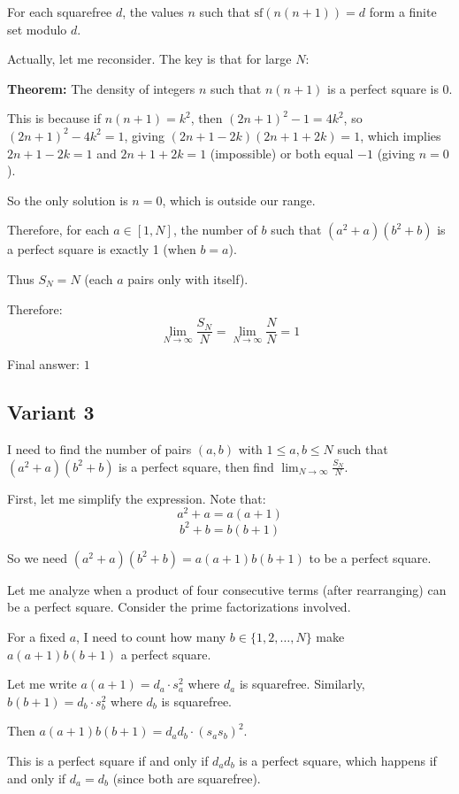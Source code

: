 \documentclass[12pt,a4paper]{article}
\theoremstyle{definition}
\begin{document}
    For each squarefree $d$, the values $n$ such that $\text{sf}(n(n+1)) = d$ form a finite set modulo $d$.

    Actually, let me reconsider. The key is that for large $N$:

    \textbf{Theorem:} The density of integers $n$ such that $n(n+1)$ is a perfect square is 0.

    This is because if $n(n+1) = k^2$, then $(2n+1)^2 - 1 = 4k^2$, so $(2n+1)^2 - 4k^2 = 1$, giving $(2n+1-2k)(2n+1+2k) = 1$, which implies $2n+1-2k = 1$ and $2n+1+2k = 1$ (impossible) or both equal $-1$ (giving $n = 0$).

    So the only solution is $n = 0$, which is outside our range.

    Therefore, for each $a \in [1,N]$, the number of $b$ such that $(a^2+a)(b^2+b)$ is a perfect square is exactly 1 (when $b = a$).

    Thus $S_N = N$ (each $a$ pairs only with itself).

    Therefore:
    $$\lim_{N \to \infty} \frac{S_N}{N} = \lim_{N \to \infty} \frac{N}{N} = 1$$

    Final answer: $1$
\subsection{Variant 3}
    I need to find the number of pairs $(a,b)$ with $1 \leq a,b \leq N$ such that $(a^2 + a)(b^2 + b)$ is a perfect square, then find $\lim_{N \to \infty} \frac{S_N}{N}$.

    First, let me simplify the expression. Note that:
    $$a^2 + a = a(a+1)$$
    $$b^2 + b = b(b+1)$$

    So we need $(a^2 + a)(b^2 + b) = a(a+1)b(b+1)$ to be a perfect square.

    Let me analyze when a product of four consecutive terms (after rearranging) can be a perfect square. Consider the prime factorizations involved.

    For a fixed $a$, I need to count how many $b \in \{1, 2, \ldots, N\}$ make $a(a+1)b(b+1)$ a perfect square.

    Let me write $a(a+1) = d_a \cdot s_a^2$ where $d_a$ is squarefree. Similarly, $b(b+1) = d_b \cdot s_b^2$ where $d_b$ is squarefree.

    Then $a(a+1)b(b+1) = d_a d_b \cdot (s_a s_b)^2$.

    This is a perfect square if and only if $d_a d_b$ is a perfect square, which happens if and only if $d_a = d_b$ (since both are squarefree).
\end{document}
